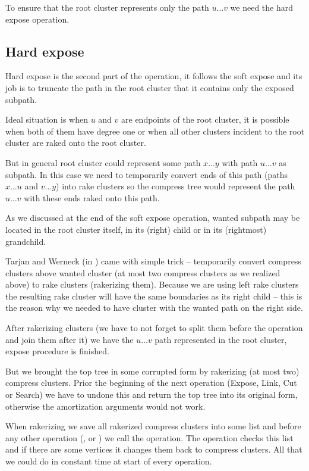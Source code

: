 To ensure that the root cluster represents only the path $u\dots v$ we need the
hard expose operation.

\subsection{Hard expose}

Hard expose is the second part of the \Expose{} operation, it follows the soft
expose and its job is to truncate the path in the root cluster that it contains
only the exposed subpath.

Ideal situation is when $u$ and $v$ are endpoints of the root cluster, it is
possible when both of them have degree one or when all other clusters incident
to the root cluster are raked onto the root cluster.

But in general root cluster could represent some path $x\dots y$ with path $u\dots v$
as subpath. In this case we need to temporarily convert ends of this path (paths
$x\dots u$ and $v\dots y$) into rake clusters so the compress tree would represent the
path $u\dots v$ with these ends raked onto this path.

As we discussed at the end of the soft expose operation, wanted subpath may be
located in the root cluster itself, in its (right) child or in its (rightmost)
grandchild.

Tarjan and Werneck (in \cite{SelfAdjustingTT}) came with simple trick -- temporarily
convert compress clusters above wanted cluster (at most two compress clusters as
we realized above) to rake clusters ({\I rakerizing} them). Because we are using
left rake clusters the resulting rake cluster will have the same boundaries as
its right child -- this is the reason why we needed to have cluster with the
wanted path on the right side.

After rakerizing clusters (we have to not forget to split them before the
operation and join them after it) we have the $u\dots v$ path represented in
the root cluster, expose procedure is finished.

But we brought the top tree in some corrupted form by rakerizing (at most two)
compress clusters. Prior the beginning of the next operation (Expose, Link, Cut
or Search) we have to undone this and return the top tree into its original
form, otherwise the amortization arguments would not work.

When rakerizing we save all rakerized compress clusters into some list and
before any other operation (\Cut, \Link or \Expose) we call the \Restore{} operation.
The \Restore{} operation checks this list and if there are some vertices it changes
them back to compress clusters. All that we could do in constant time at start
of every operation.

